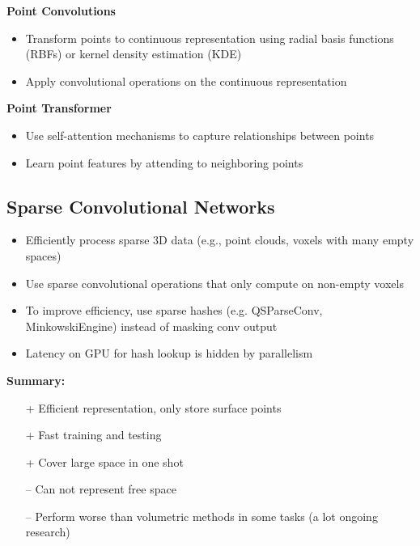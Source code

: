 \textbf{Point Convolutions}
\begin{itemize}
    \item Transform points to continuous representation using radial basis functions (RBFs) or kernel density estimation (KDE)
    \item Apply convolutional operations on the continuous representation
\end{itemize}

\textbf{Point Transformer}
\begin{itemize}
    \item Use self-attention mechanisms to capture relationships between points
    \item Learn point features by attending to neighboring points
\end{itemize}


\subsection{Sparse Convolutional Networks}
\begin{itemize}
    \item Efficiently process sparse 3D data (e.g., point clouds, voxels with many empty spaces)
    \item Use sparse convolutional operations that only compute on non-empty voxels
    \item To improve efficiency, use sparse hashes (e.g. QSParseConv, MinkowskiEngine) instead of masking conv output
    \item Latency on GPU for hash lookup is hidden by parallelism
\end{itemize}

\textbf{Summary:}
\begin{itemize}[label={}] %
    \item[+] Efficient representation, only store surface points
    \item[+] Fast training and testing
    \item[+] Cover large space in one shot
    \item[--] Can not represent free space
    \item[--] Perform worse than volumetric methods in some tasks (a lot ongoing research)
\end{itemize}  


